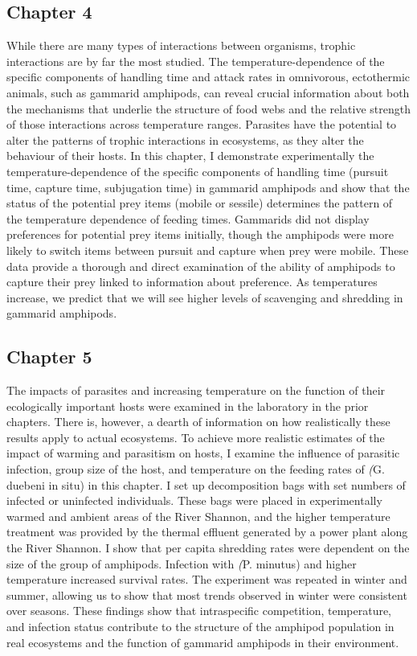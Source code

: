 \subsection{Chapter 4}
While there are many types of interactions between organisms, trophic interactions are by far the most studied. The temperature-dependence of the specific components of handling time and attack rates in omnivorous, ectothermic animals, such as gammarid amphipods, can reveal crucial information about both the mechanisms that underlie the structure of food webs and the relative strength of those interactions across temperature ranges. Parasites have the potential to alter the patterns of trophic interactions in ecosystems, as they alter the behaviour of their hosts. In this chapter, I demonstrate experimentally the temperature-dependence of the specific components of handling time (pursuit time, capture time, subjugation time) in gammarid amphipods and show that the status of the potential prey items (mobile or sessile) determines the pattern of the temperature dependence of feeding times.  Gammarids did not display preferences for potential prey items initially, though the amphipods were more likely to switch items between pursuit and capture when prey were mobile.  These data provide a thorough and direct examination of the ability of amphipods to capture their prey linked to information about preference. As temperatures increase, we predict that we will see higher levels of scavenging and shredding in gammarid amphipods. 

\subsection{Chapter 5}
The impacts of parasites and increasing temperature on the function of their ecologically important hosts were examined in the laboratory in the prior chapters. There is, however, a dearth of information on how realistically these results apply to actual ecosystems. To achieve more realistic estimates of the impact of warming and parasitism on hosts, I examine the influence of parasitic infection, group size of the host, and temperature on the feeding rates of \emph(G. duebeni in situ) in this chapter. I set up decomposition bags with set numbers of infected or uninfected individuals. These bags were placed in experimentally warmed and ambient areas of the River Shannon, and the higher temperature treatment was provided by the thermal effluent generated by a power plant along the River Shannon. I show that per capita shredding rates were dependent on the size of the group of amphipods. Infection with \emph(P. minutus) and higher temperature increased survival rates. The experiment was repeated in winter and summer, allowing us to show that most trends observed in winter were consistent over seasons. These findings show that intraspecific competition, temperature, and infection status contribute to the structure of the amphipod population in real ecosystems and the function of gammarid amphipods in their environment. 

